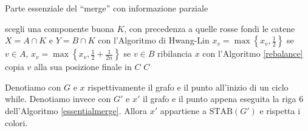 \begin{algorithm}
  \caption{Parte essenziale del ``merge'' con informazione parziale} \label{essentialmerge} 
  \begin{algorithmic}
    [1]  \STATE scegli una componente buona \(K\), con precedenza a quelle rosse \STATE fondi le catene \(X=A\cap K\) e \(Y=B\cap K\) con l'Algoritmo di Hwang-Lin  \STATE \(x_v=\max{\left\{x_v, \frac{1}{2}\right\}}\) se \(v\in A\), \(x_v=\max{\left\{x_v, \frac{1}{2}+\frac{1}{2n}\right\}}\) se \(v\in B\) \ENDFOR \STATE ribilancia \(x\) con l'Algoritmo \ref{rebalance}   \STATE copia \(v\) alla sua posizione finale in \(C\) \ENDIF \ENDFOR \ENDWHILE \RETURN \(C\) 
  \end{algorithmic}
\end{algorithm}
\begin{lemma}
  \label{evolutionlemma} Denotiamo con \(G\) e \(x\) rispettivamente il grafo e il punto all'inizio di un ciclo while. Denotiamo invece con \(G'\) e \(x'\) il grafo e il punto appena eseguita la riga \(6\) dell'Algoritmo \ref{essentialmerge}. Allora \(x'\) appartiene a \(\text{STAB}(G')\) e rispetta i colori. 
\end{lemma}
